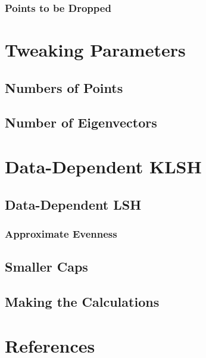 \documentclass[twoside,11pt]{homework}
\begin{document}
\begin{multicols}{2}
\subsubsection{Points to be Dropped} %

\section{Tweaking Parameters} %

\subsection{Numbers of Points}

\subsection{Number of Eigenvectors}

\section{Data-Dependent KLSH} %

\subsection{Data-Dependent LSH}

\subsubsection{Approximate Evenness}

\subsection{Smaller Caps}

\subsection{Making the Calculations}

\section{References}

\end{multicols}
\end{document}

